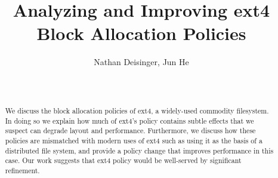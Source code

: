 \documentclass{acm_proc_article-sp}
\begin{document}
\title{Analyzing and Improving ext4 Block Allocation Policies
}

%
%
%
%
%

%
\author{
\alignauthor
Nathan Deisinger, Jun He\\
       \\
       \\
}

\maketitle
\begin{abstract}
We discuss the block allocation policies of ext4,
 a widely-used commodity filesystem. In doing so 
 we explain how much of ext4's policy contains 
 subtle effects that we suspect can degrade layout 
 and performance.  Furthermore, we discuss how these 
 policies are mismatched with modern uses of ext4 
 such as using it as the basis of a distributed file 
 system, and provide a policy change that improves 
 performance in this case.  Our work suggests that 
 ext4 policy would be well-served by significant 
 refinement.
\end{abstract}
\end{document}
